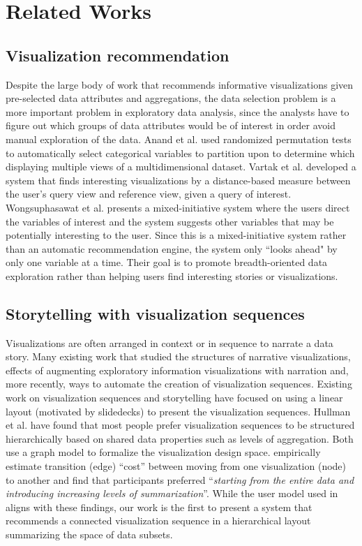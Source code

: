 \section{Related Works}
\subsection{Visualization recommendation}
\par Despite the large body of work that recommends informative visualizations given pre-selected data attributes and aggregations, the data selection problem is a more important problem in exploratory data analysis, since the analysts have to figure out which groups of data attributes would be of interest in order avoid manual exploration of the data. Anand et al. \cite{Anand2015} used randomized permutation tests to automatically select categorical variables to partition upon to determine which displaying multiple views of a multidimensional dataset. Vartak et al. \cite{Vartak2015} developed a system that finds interesting visualizations by a distance-based measure between the user's query view and reference view,  given a query of interest. Wongsuphasawat et al. \cite{Wongsuphasawat2016} presents a mixed-initiative system where the users direct the variables of interest and the system suggests other variables that may be potentially interesting to the user. Since this is a mixed-initiative system rather than an automatic recommendation engine, the system only ``looks ahead"  by only one variable at a time. Their goal is to promote breadth-oriented data exploration rather than helping users find interesting stories or visualizations.
\subsection{Storytelling with visualization sequences}
Visualizations are often arranged in context or in sequence to narrate a data story. Many existing work that studied the structures of narrative visualizations\cite{Segel2010,Hullman2017}, effects of augmenting exploratory information visualizations with narration\cite{Boy2015} and, more recently, ways to automate the creation of visualization sequences\cite{Hullman2013,Kim2017}. Existing work on visualization sequences and storytelling have focused on using a linear layout (motivated by slidedecks) to present the visualization sequences. Hullman et al. \cite{Hullman2017} have found that most people prefer visualization sequences to be structured hierarchically based on shared data properties such as levels of aggregation. Both \cite{Hullman2013,Kim2017} use a graph model to formalize the visualization design space. \cite{Kim2017} empirically estimate transition (edge) ``cost'' between moving from one visualization (node) to another and find that participants preferred ``\textit{starting from the entire data and introducing increasing levels of summarization}''. While the user model used in \system aligns with these findings, our work is the first to present a system that recommends a connected visualization sequence in a hierarchical layout summarizing the space of data subsets.

